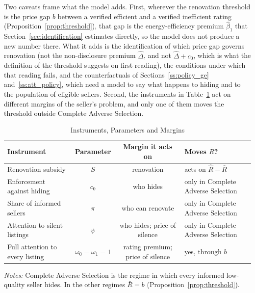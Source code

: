 \documentclass[10pt,letterpaper]{bp-template-concise}
\begin{document}
Two caveats frame what the model adds. First, wherever the renovation threshold is the price gap $b$ between a verified efficient and a verified inefficient rating (Proposition~\ref{prop:threshold}), that gap is the energy-efficiency premium $\hat\beta_1$ that Section~\ref{sec:identification} estimates directly, so the model does not produce a new number there. What it adds is the identification of which price gap governs renovation (not the non-disclosure premium $\hat\Delta$, and not $\hat\Delta+c_0$, which is what the definition of the threshold suggests on first reading), the conditions under which that reading fails, and the counterfactuals of Sections~\ref{ss:policy_ge} and~\ref{ss:att_policy}, which need a model to say what happens to hiding and to the population of eligible sellers. Second, the instruments in Table~\ref{tab:instruments} act on different margins of the seller's problem, and only one of them moves the threshold outside Complete Adverse Selection.

\begin{table}[htbp]
\centering
\caption{Instruments, Parameters and Margins}
\label{tab:instruments}
\footnotesize\renewcommand{\arraystretch}{1.3}
\begin{tabular*}{\textwidth}{@{\extracolsep{\fill}}lccl@{}}
\toprule\toprule
\textbf{Instrument} & \textbf{Parameter} & \textbf{Margin it acts on} & \textbf{Moves $\bar R$?} \\
\midrule
Renovation subsidy & $S$ & renovation & acts on $\hat R-\bar R$ \\
Enforcement against hiding & $c_0$ & who hides & only in Complete Adverse Selection \\
Share of informed sellers & $\pi$ & who can renovate & only in Complete Adverse Selection \\
Attention to silent listings & $\psi$ & who hides; price of silence & only in Complete Adverse Selection \\
Full attention to every listing & $\omega_0=\omega_1=1$ & rating premium; price of silence & yes, through $b$ \\
\bottomrule\bottomrule
\end{tabular*}
\vspace{0.5em}

\raggedright
\footnotesize
\textit{Notes:} Complete Adverse Selection is the regime in which every informed low-quality seller hides. In the other regimes $\bar R=b$ (Proposition~\ref{prop:threshold}).
\end{table}
\end{document}
